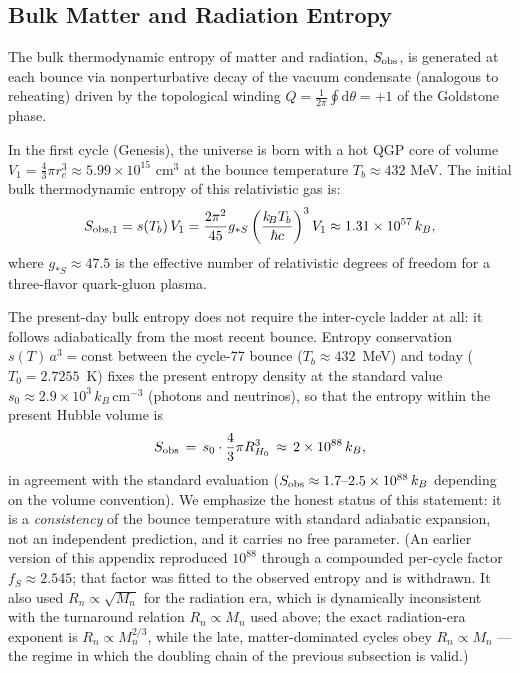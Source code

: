 \documentclass[12pt,a4paper]{article}
\theoremstyle{plain}
\theoremstyle{definition}
\theoremstyle{remark}
\newcommand{\kB}{k_{\!B}}
\newcommand{\dd}{\mathrm{d}}
\begin{document}
\subsection{Bulk Matter and Radiation Entropy}
The bulk thermodynamic entropy of matter and radiation, $S_{\rm obs}$, is generated at each bounce via nonperturbative decay of the vacuum condensate (analogous to reheating) driven by the topological winding $Q = \frac{1}{2\pi}\oint \dd\theta = +1$ of the Goldstone phase.

In the first cycle (Genesis), the universe is born with a hot QGP core of volume $V_1 = \frac{4}{3}\pi r_c^3 \approx 5.99 \times 10^{15} \text{ cm}^3$ at the bounce temperature $T_b \approx 432$ MeV. The initial bulk thermodynamic entropy of this relativistic gas is:
\begin{equation}
  S_{\rm obs, 1} = s(T_b)\,V_1 = \frac{2\pi^2}{45} g_{*S} \left( \frac{\kB T_b}{\hbar c} \right)^3 V_1 \approx 1.31 \times 10^{57} \, k_B,
\end{equation}
where $g_{*S} \approx 47.5$ is the effective number of relativistic degrees of freedom for a three-flavor quark-gluon plasma.

The present-day bulk entropy does not require the inter-cycle ladder at all:
it follows adiabatically from the most recent bounce. Entropy conservation
$s(T)\,a^3 = \mathrm{const}$ between the cycle-77 bounce ($T_b \approx 432$~MeV)
and today ($T_0 = 2.7255$~K) fixes the present entropy density at the standard
value $s_0 \approx 2.9 \times 10^{3}\,k_B\,\mathrm{cm}^{-3}$ (photons and
neutrinos), so that the entropy within the present Hubble volume is
\begin{equation}
  S_{\rm obs} \,=\, s_0 \cdot \frac{4}{3}\pi R_{H_0}^{3}
  \,\approx\, 2 \times 10^{88}\,k_B,
\end{equation}
in agreement with the standard evaluation
($S_{\rm obs} \approx 1.7\text{--}2.5 \times 10^{88}\,k_B$ depending on the
volume convention). We emphasize the honest status of this statement: it is a
\emph{consistency} of the bounce temperature with standard adiabatic
expansion, not an independent prediction, and it carries no free parameter.
(An earlier version of this appendix reproduced $10^{88}$ through a compounded
per-cycle factor $f_S \approx 2.545$; that factor was fitted to the observed
entropy and is withdrawn. It also used $R_n \propto \sqrt{M_n}$ for the
radiation era, which is dynamically inconsistent with the turnaround relation
$R_n \propto M_n$ used above; the exact radiation-era exponent is
$R_n \propto M_n^{2/3}$, while the late, matter-dominated cycles obey
$R_n \propto M_n$ — the regime in which the doubling chain of the previous
subsection is valid.)
\end{document}
